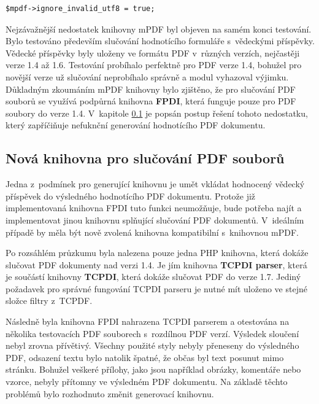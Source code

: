 \begin{lstlisting}[caption = {Nastavení atributu \textbf{ignore\_invalid\_utf8} (orlib.php)}, label = {lst:ignore_invalid_utf8}, captionpos=b]
$mpdf->ignore_invalid_utf8 = true;
\end{lstlisting}
\par
Nejzávažnější nedostatek knihovny mPDF byl objeven na samém konci testování. Bylo testováno především slučování hodnotícího formuláře s~vědeckými příspěvky. Vědecké příspěvky byly uloženy ve formátu PDF v~různých verzích, nejčastěji verze 1.4 až 1.6. Testování probíhalo perfektně pro PDF verze 1.4, bohužel pro novější verze už slučování neprobíhalo správně a modul vyhazoval výjimku. Důkladným zkoumáním mPDF knihovny bylo zjištěno, že pro slučování PDF souborů se využívá podpůrná knihovna \textbf{FPDI}, která funguje pouze pro PDF soubory do verze 1.4. V~kapitole \ref{subsec:nova_PDF_merge_knihovna} je popsán postup řešení tohoto nedostatku, který zapříčiňuje nefuknční generování hodnotícího PDF dokumentu.

\subsection{Nová knihovna pro slučování PDF souborů}
\label{subsec:nova_PDF_merge_knihovna}
Jedna z~podmínek pro generující knihovnu je umět vkládat hodnocený vědecký příspěvek do výsledného hodnotícího PDF dokumentu. Protože již implementovaná knihovna FPDI tuto funkci neumožňuje, bude potřeba najít a implementovat jinou knihovnu splňující slučování PDF dokumentů. V~ideálním případě by měla být nově zvolená knihovna kompatibilní s~knihovnou mPDF.
\par
Po rozsáhlém průzkumu byla nalezena pouze jedna PHP knihovna, která dokáže slučovat PDF dokumenty nad verzi 1.4. Je jím knihovna \textbf{TCPDI parser}, která je součástí knihovny \textbf{TCPDI}, která dokáže slučovat PDF do verze 1.7. Jediný požadavek pro správné fungování TCPDI parseru je nutné mít uloženo ve stejné složce filtry z~TCPDF.
\par
Následně byla knihovna FPDI nahrazena TCPDI parserem a otestována na několika testovacích PDF souborech s~rozdílnou PDF verzí. Výsledek sloučení nebyl zrovna přívětivý. Všechny použité styly nebyly přeneseny do výsledného PDF, odsazení textu bylo natolik špatné, že občas byl text posunut mimo stránku.  Bohužel veškeré přílohy, jako jsou například obrázky, komentáře nebo vzorce, nebyly přítomny ve výsledném PDF dokumentu. Na základě těchto problémů bylo rozhodnuto změnit generovací knihovnu. 

